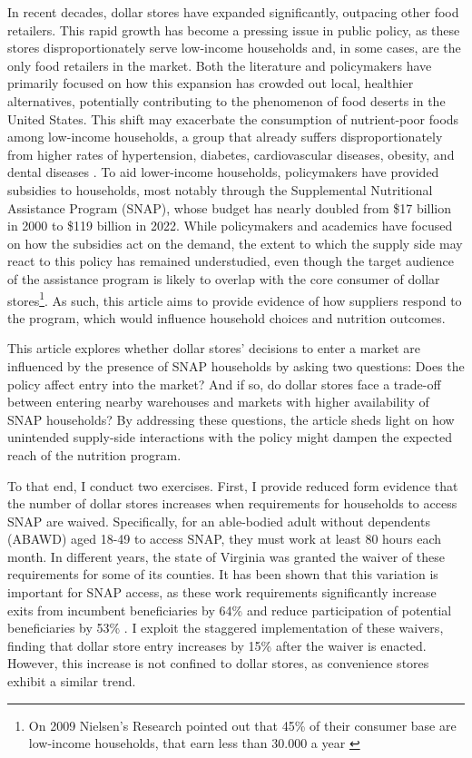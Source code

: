\documentclass[11.5pt]{article}
\begin{document}
% 
In recent decades, dollar stores have expanded significantly, outpacing other food retailers. This rapid growth has become a pressing issue in public policy, as these stores disproportionately serve low-income households and, in some cases, are the only food retailers in the market. Both the literature and policymakers have primarily focused on how this expansion has crowded out local, healthier alternatives, potentially contributing to the phenomenon of food deserts in the United States. This shift may exacerbate the consumption of nutrient-poor foods among low-income households, a group that already suffers disproportionately from higher rates of hypertension, diabetes, cardiovascular diseases, obesity, and dental diseases \cite{shenkin2010using}. To aid lower-income households, policymakers have provided subsidies to households, most notably through the Supplemental Nutritional Assistance Program (SNAP), whose budget has nearly doubled from \$17 billion in 2000 to \$119 billion in 2022. While policymakers and academics have focused on how the subsidies act on the demand, the extent to which the supply side may react to this policy has remained understudied, even though the target audience of the assistance program is likely to overlap with the core consumer of dollar stores\footnote{On 2009 Nielsen's Research pointed out that 45\% of their consumer base are low-income households, that earn less than 30.000 a year \cite{nielsen2009dollarstores}}. As such, this article aims to provide evidence of how suppliers respond to the program, which would influence household choices and nutrition outcomes.


This article explores whether dollar stores' decisions to enter a market are influenced by the presence of SNAP households by asking two questions: Does the policy affect entry into the market? And if so, do dollar stores face a trade-off between entering nearby warehouses and markets with higher availability of SNAP households? By addressing these questions, the article sheds light on how unintended supply-side interactions with the policy might dampen the expected reach of the nutrition program.



To that end, I conduct two exercises. First, I provide reduced form evidence that the number of dollar stores increases when requirements for households to access SNAP are waived. Specifically, for an able-bodied adult without dependents (ABAWD) aged 18-49 to access SNAP, they must work at least 80 hours each month. In different years, the state of Virginia was granted the waiver of these requirements for some of its counties. It has been shown that this variation is important for SNAP access, as these work requirements significantly increase exits from incumbent beneficiaries by 64\% and reduce participation of potential beneficiaries by 53\% \cite{gray2023employed}. I exploit the staggered implementation of these waivers, finding that dollar store entry increases by 15\% after the waiver is enacted. However, this increase is not confined to dollar stores, as convenience stores exhibit a similar trend.
\end{document}
